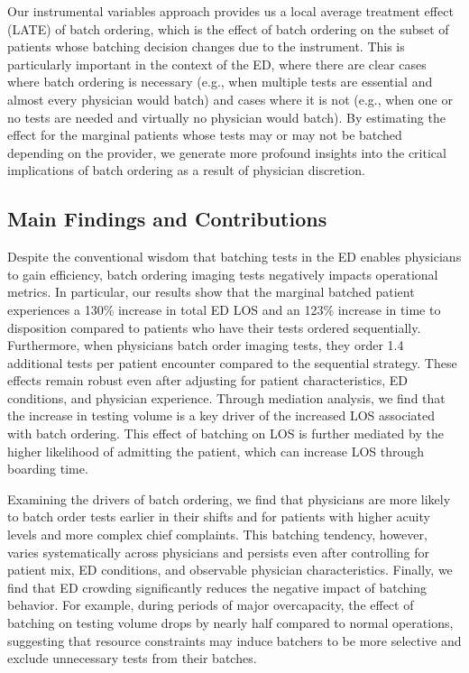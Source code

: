 \documentclass[,,nonblindrev]{informs}
\begin{document}
Our instrumental variables approach provides us a local average
treatment effect (LATE) of batch ordering, which is the effect of batch
ordering on the subset of patients whose batching decision changes due
to the instrument. This is particularly important in the context of the
ED, where there are clear cases where batch ordering is necessary (e.g.,
when multiple tests are essential and almost every physician would
batch) and cases where it is not (e.g., when one or no tests are needed
and virtually no physician would batch). By estimating the effect for
the marginal patients whose tests may or may not be batched depending on
the provider, we generate more profound insights into the critical
implications of batch ordering as a result of physician discretion.

\subsection{Main Findings and
Contributions}\label{main-findings-and-contributions}

Despite the conventional wisdom that batching tests in the ED enables
physicians to gain efficiency, batch ordering imaging tests negatively
impacts operational metrics. In particular, our results show that the
marginal batched patient experiences a 130\% increase in total ED LOS
and an 123\% increase in time to disposition compared to patients who
have their tests ordered sequentially. Furthermore, when physicians
batch order imaging tests, they order 1.4 additional tests per patient
encounter compared to the sequential strategy. These effects remain
robust even after adjusting for patient characteristics, ED conditions,
and physician experience. Through mediation analysis, we find that the
increase in testing volume is a key driver of the increased LOS
associated with batch ordering. This effect of batching on LOS is
further mediated by the higher likelihood of admitting the patient,
which can increase LOS through boarding time.

Examining the drivers of batch ordering, we find that physicians are
more likely to batch order tests earlier in their shifts and for
patients with higher acuity levels and more complex chief complaints.
This batching tendency, however, varies systematically across physicians
and persists even after controlling for patient mix, ED conditions, and
observable physician characteristics. Finally, we find that ED crowding
significantly reduces the negative impact of batching behavior. For
example, during periods of major overcapacity, the effect of batching on
testing volume drops by nearly half compared to normal operations,
suggesting that resource constraints may induce batchers to be more
selective and exclude unnecessary tests from their batches.
\end{document}
